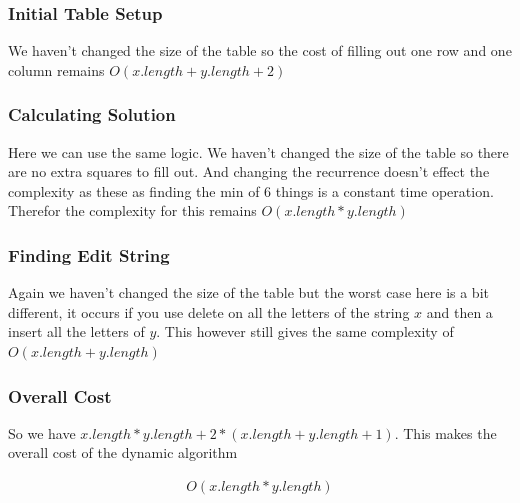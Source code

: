 \documentclass{article}
\begin{document}
					\subsubsection{Initial Table Setup}
						We haven't changed the size of the table so the cost of filling out one row and one column remains $O(x.length + y.length + 2)$
						
					\subsubsection{Calculating Solution}
						Here we can use the same logic. We haven't changed the size of the table so there are no extra squares to fill out. And changing the recurrence doesn't effect the complexity as these as finding the min of 6 things is a constant time operation. Therefor the complexity for this remains $O(x.length * y.length)$
						
					\subsubsection{Finding Edit String}
						Again we haven't changed the size of the table but the worst case here is a bit different, it occurs if you use delete on all the letters of the string $x$ and then a insert all the letters of $y$. This however still gives the same complexity of $O(x.length + y.length)$
						
					\subsubsection{Overall Cost}
						So we have $x.length * y.length + 2*(x.length + y.length + 1)$. This makes the overall cost of the dynamic algorithm
						
						\begin{align*}
  							O(x.length * y.length)
  						\end{align*}
\end{document}
